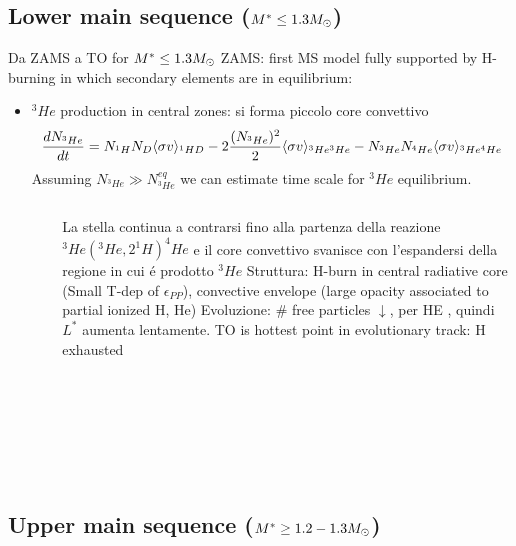 \subsection{Lower main sequence ($M^*\leq1.3\msun{}$)}

\begin{frame}{Da ZAMS a TO for $M^*\leq1.3\msun{}$}
ZAMS: first MS model fully supported by H-burning in which secondary elements are in equilibrium:
\begin{itemize}
\item $^3He$ production in central zones: si forma piccolo core convettivo
    \[\TDy{t}{N_{^3He}}=N_{^1H}N_D\exv{\sigma v}_{^1HD}-2\frac{(N_{^3He})^2}{2}\exv{\sigma v}_{^3He^3He}-N_{^3He}N_{^4He}\exv{\sigma v}_{^3He^4He}\]
    Assuming $N_{^3He}\gg N_{^3He}^{eq}$ we can estimate time scale for $^3He$ equilibrium.
\end{itemize}
\begin{columns}[T]\begin{column}{0.4\textwidth}
\begin{figure}[!ht]\texttt{[image: HRD-LMS]}\label{fig:HRD-LMS}
\end{figure}
\end{column}\begin{column}{0.50\textwidth}
La stella continua a contrarsi fino alla partenza della reazione $^3He(^3He,2^1H)^4He$ e il core convettivo svanisce con l'espandersi della regione in cui \'e prodotto $^3He$
Struttura: H-burn in central radiative core (Small T-dep of $\epsilon_{PP}$), convective envelope (large opacity associated to partial ionized H, He)
Evoluzione: $\#$ free particles $\downarrow$, \xaumenta{\mu} per HE 
,  quindi $L^*$ aumenta lentamente.
TO is hottest point in evolutionary track: H exhausted 
\end{column}\end{columns}
\end{frame}


\subsection{Upper main sequence ($M^*\geq1.2-1.3\msun{}$)}


